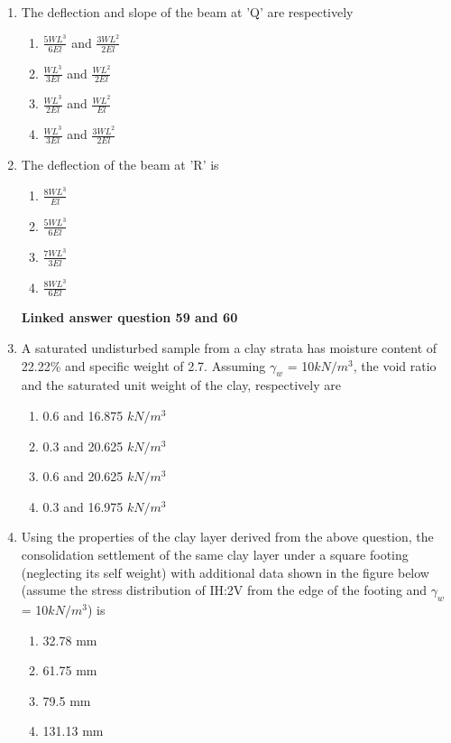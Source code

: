\documentclass[journal]{IEEEtran}
\begin{document}
\begin{enumerate}
\item The deflection and slope of the beam at 'Q' are respectively 
\begin{enumerate}
    \item $\frac{5WL^{3}}{6El}$ and $\frac{3WL^{2}}{2El}$
        \item $\frac{WL^{3}}{3El}$ and $\frac{WL^{2}}{2El}$
    \item $\frac{WL^{3}}{2El}$ and $\frac{WL^{2}}{El}$
    \item $\frac{WL^{3}}{3El}$ and $\frac{3WL^{2}}{2El}$        
\end{enumerate}
\item The deflection of the beam at 'R' is
\begin{enumerate}
    \item $\frac{8WL^{3}}{El}$
        \item $\frac{5WL^{3}}{6El}$
    \item $\frac{7WL^{3}}{3El}$
    \item $\frac{8WL^{3}}{6El}$ \\
\end{enumerate}
\textbf{Linked answer question 59 and 60} 
\item A saturated undisturbed sample from a clay strata has moisture content of 22.22\% and specific weight of 2.7. Assuming $\gamma_{w}$ = 10$kN/m^{3}$, the void ratio and the saturated unit weight of the clay, respectively are
\begin{enumerate}
    \item 0.6 and 16.875 $kN/m^{3}$
        \item 0.3 and 20.625 $kN/m^{3}$
    \item 0.6 and 20.625 $kN/m^{3}$
    \item 0.3 and 16.975 $kN/m^{3}$
\end{enumerate}
\item Using the properties of the clay layer derived from the above question, the consolidation settlement of the same clay layer under a square footing (neglecting its self weight) with additional data shown in the figure below (assume the stress distribution of IH:2V from the edge of the footing and $\gamma_{w}$ = 10$kN/m^{3}$) is 

\begin{figure}[H]
			\centering
			
			
		\end{figure}

\begin{enumerate}
    \item 32.78 mm
        \item 61.75 mm
    \item 79.5 mm
    \item 131.13 mm
\end{enumerate}
\end{enumerate}
\end{document}
